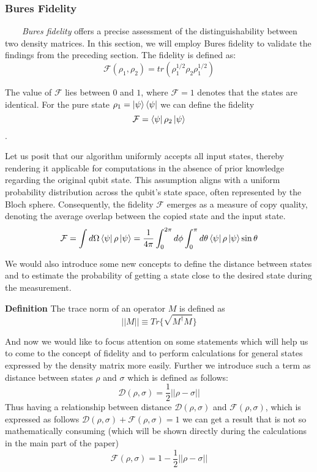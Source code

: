 \documentclass[english,14pt,a4paper]{article}
\begin{document}
	\subsubsection*{Bures Fidelity} \ \ \ \
	\textit{Bures fidelity} offers a precise assessment of the distinguishability between two density matrices. In this section, we will employ Bures fidelity to validate the findings from the preceding section. The fidelity is defined as: 
	\begin{equation}
		\mathcal{F}(\rho_1, \rho_2) = tr(\rho_1^{1/2}\rho_2\rho_1^{1/2})
	\end{equation}
	
	The value of $\mathcal{F}$ lies between $0$ and $1$, where $\mathcal{F} = 1$ denotes that the states are identical. For the pure state $\rho_1 = \ket{\psi}\bra{\psi}$ we can define the fidelity \[\mathcal{F} = \bra{\psi}\rho_2 \ket{\psi}\].
	
	Let us posit that our algorithm uniformly accepts all input states, thereby rendering it applicable for computations in the absence of prior knowledge regarding the original qubit state. This assumption aligns with a uniform probability distribution across the qubit's state space, often represented by the Bloch sphere. Consequently, the fidelity $\mathcal{F}$ emerges as a measure of copy quality, denoting the average overlap between the copied state and the input state.
	\[ \mathcal{F} = \int d\Omega \bra{\psi}\rho\ket{\psi} =\frac{1}{4\pi} \int_0^{2\pi}d\phi \int_0^{\pi} d\theta \bra{\psi}\rho\ket{\psi} \sin{\theta}\]
	
	We would also introduce some new concepts to define the distance between states and to estimate the probability of getting a state close to the desired state during the measurement.  
	
	\textbf{Definition} The trace norm of an operator $M$ is defined as \[ ||M|| \equiv Tr{\{\sqrt{M^{\dag}M}}\}\]
	
	And now we would like to focus attention on some statements which will help us to come to the concept of fidelity and to perform calculations for general states expressed by the density matrix more easily. Further we introduce such a term as distance between states $\rho$ and $\sigma$ which is defined as follows: 
	\[\mathcal{D}(\rho, \sigma) = \frac12 ||\rho - \sigma||\]
	Thus having a relationship between distance $\mathcal{D}(\rho, \sigma)$ and $\mathcal{F}(\rho, \sigma)$, which is expressed as follows $\mathcal{D}(\rho, \sigma) + \mathcal{F}(\rho, \sigma) = 1$ we can get a result that is not so mathematically consuming (which will be shown directly during the calculations in the main part of the paper) \[\mathcal{F}(\rho, \sigma) = 1 - \frac12 ||\rho - \sigma||\]
	
\end{document}
